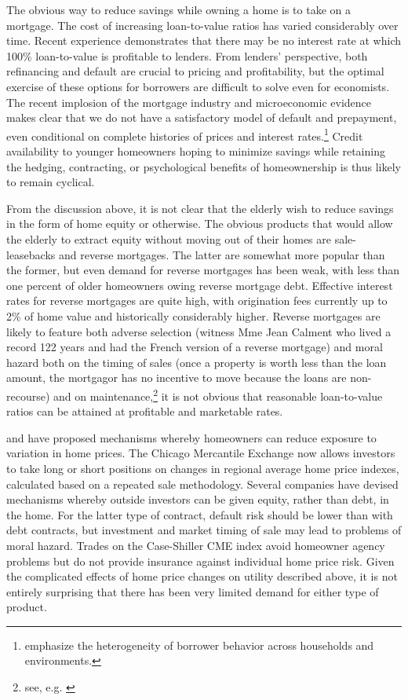 \documentclass[12pt]{article}
\begin{document}
The obvious way to reduce savings while owning a home is to take on a mortgage.
The cost of increasing loan-to-value ratios has varied considerably over time.
Recent experience demonstrates that there may be no interest rate at which 100\%
loan-to-value is profitable to lenders.  From lenders' perspective, both
refinancing and default are crucial to pricing and profitability, but the
optimal exercise of these options for borrowers are difficult to solve even for
economists.  The recent implosion of the mortgage industry and microeconomic
evidence makes clear that we do not have a satisfactory model of default and
prepayment, even conditional on complete histories of prices and interest
rates.\footnote{\citet{DengQuigleyVanOrder} emphasize the heterogeneity of
borrower behavior across households and environments.}  Credit availability to
younger homeowners hoping to minimize savings while retaining the hedging,
contracting, or psychological benefits of homeownership is thus likely to remain
cyclical.

From the discussion above, it is not clear that the elderly wish to reduce
savings in the form of home equity or otherwise.  The obvious products that
would allow the elderly to extract equity without moving out of their homes are
sale-leasebacks and reverse mortgages.  The latter are somewhat more popular
than the former, but even demand for reverse mortgages has been weak, with less
than one percent of older homeowners owing reverse mortgage debt.  Effective
interest rates for reverse mortgages are quite high, with origination fees
currently up to 2\% of home value and historically considerably higher.  Reverse
mortgages are likely to feature both adverse selection (witness Mme Jean Calment
who lived a record 122 years and had the French version of a reverse mortgage)
and moral hazard both on the timing of sales (once a property is worth less than
the loan amount, the mortgagor has no incentive to move because the loans are
non-recourse) and on maintenance,\footnote{see, e.g. \citet{MiceliSirmans}} it
is not obvious that reasonable loan-to-value ratios can be attained at
profitable and marketable rates.

\citet{Shiller} and \citet{CaplinChanFreemanTracy} have proposed mechanisms
whereby homeowners can reduce exposure to variation in home prices.  The Chicago
Mercantile Exchange now allows investors to take long or short positions on
changes in regional average home price indexes, calculated based on a repeated
sale methodology.  Several companies have devised mechanisms whereby outside
investors can be given equity, rather than debt, in the home.  For the latter
type of contract, default risk should be lower than with debt contracts, but
investment and market timing of sale may lead to problems of moral hazard.
Trades on the Case-Shiller CME index avoid homeowner agency problems but do not
provide insurance against individual home price risk.  Given the complicated
effects of home price changes on utility described above, it is not entirely
surprising that there has been very limited demand for either type of product.
\end{document}
